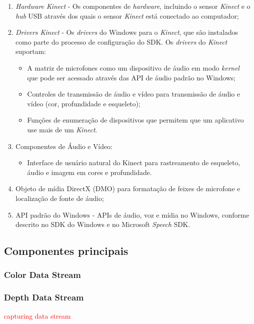 \begin{enumerate}
    \item \textit{Hardware Kinect} - Os componentes de \textit{hardware}, incluindo o sensor \textit{Kinect} e o \textit{hub} USB através dos quais o sensor \textit{Kinect} está conectado ao computador;
    \item \textit{Drivers Kinect} - Os \textit{drivers} do Windows para o \textit{Kinect}, que são instalados como parte do processo de configuração do SDK. Os \textit{drivers} do \textit{Kinect} suportam:
        \begin{itemize}
            \item A matriz de microfones como um dispositivo de áudio em modo \textit{kernel} que pode ser acessado  através das API de áudio padrão no Windows; 
            \item Controles de transmissão de áudio e vídeo para transmissão de áudio e vídeo (cor, profundidade e esqueleto);
            \item Funções de enumeração de dispositivos que permitem que um aplicativo use mais de um \textit{Kinect}.	
        \end{itemize} 
    \item Componentes de Áudio e Vídeo:
        \begin{itemize}
            \item Interface de usuário natural do Kinect para rastreamento de esqueleto, áudio e imagem em cores e profundidade. 
        \end{itemize}
    \item Objeto de mídia DirectX (DMO) para formatação de feixes de microfone e localização de fonte de áudio;
    \item API padrão do Windows - APIs de áudio, voz e mídia no Windows, conforme descrito no SDK do Windows e no Microsoft \textit{Speech} SDK.
\end{enumerate}


\subsection{Componentes principais}\label{sec:componentes}

\subsubsection{Color Data Stream}\label{sec:colorDataStream}

\subsubsection{Depth Data Stream}\label{sec:depthDataStream}
\textcolor{red}{capturing data stream}

